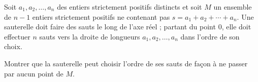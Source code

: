 Soit $a_1, a_2, \ldots, a_n$ des entiers strictement positifs distincts et soit $M$ un ensemble de $n - 1$
entiers strictement positifs ne contenant pas $s = a_1 + a_2 + \cdots + a_n$. Une sauterelle doit faire des
sauts le long de l'axe réel ; partant du point $0$, elle doit effectuer $n$ sauts vers la droite de longueurs
$a_1, a_2, \ldots, a_n$ dans l'ordre de son choix.

Montrer que la sauterelle peut choisir l'ordre de ses sauts de façon à ne passer par aucun point de $M$.
